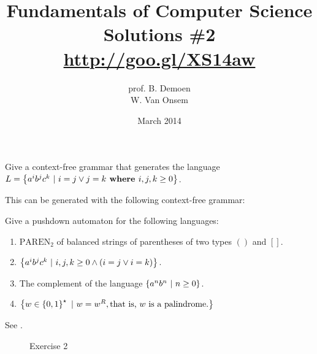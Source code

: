 \documentclass{article}
\title{Fundamentals of Computer Science\\Solutions \#2\\\url{http://goo.gl/XS14aw}}
\author{prof. B. Demoen\\W. Van Onsem}
\date{March 2014}
\begin{document}
\maketitle
\begin{exercise}
Give a context-free grammar that generates the language $L=\left\{ a^ib^jc^k\ |\ i=j\vee j=k \mbox{\bf{ where }} i,j,k\geq0 \right\}$.
\begin{answer}This can be generated with the following context-free grammar:
\end{answer}
\end{exercise}

\begin{exercise}
Give a pushdown automaton for the following languages:
\begin{enumerate}
 \item $\mbox{PAREN}_2$ of balanced strings of parentheses of two types $()$ and $[]$.
 \item $\left\{ a^ib^jc^k\ |\ i,j,k\geq0\wedge \left( i=j\vee i=k \right) \right\}$.
 \item The complement of the language $\left\{ a^nb^n\ |\ n\geq 0 \right\}$.
 \item $\left\{ w\in\left\{ 0,1 \right\}^{\star}\ |\ w=w^R, \mbox{that is, $w$ is a palindrome.} \right\}$
\end{enumerate}
\begin{answer}
See .
\begin{figure}[hbt]
\centering
{}
\caption{Exercise 2}
\end{figure}
\end{answer}
\end{exercise}
\end{document}

